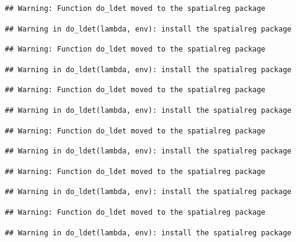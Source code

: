 \documentclass[11pt,]{article}
\begin{document}
\begin{verbatim}
## Warning: Function do_ldet moved to the spatialreg package
\end{verbatim}

\begin{verbatim}
## Warning in do_ldet(lambda, env): install the spatialreg package
\end{verbatim}

\begin{verbatim}
## Warning: Function do_ldet moved to the spatialreg package
\end{verbatim}

\begin{verbatim}
## Warning in do_ldet(lambda, env): install the spatialreg package
\end{verbatim}

\begin{verbatim}
## Warning: Function do_ldet moved to the spatialreg package
\end{verbatim}

\begin{verbatim}
## Warning in do_ldet(lambda, env): install the spatialreg package
\end{verbatim}

\begin{verbatim}
## Warning: Function do_ldet moved to the spatialreg package
\end{verbatim}

\begin{verbatim}
## Warning in do_ldet(lambda, env): install the spatialreg package
\end{verbatim}

\begin{verbatim}
## Warning: Function do_ldet moved to the spatialreg package
\end{verbatim}

\begin{verbatim}
## Warning in do_ldet(lambda, env): install the spatialreg package
\end{verbatim}

\begin{verbatim}
## Warning: Function do_ldet moved to the spatialreg package
\end{verbatim}

\begin{verbatim}
## Warning in do_ldet(lambda, env): install the spatialreg package
\end{verbatim}
\end{document}

